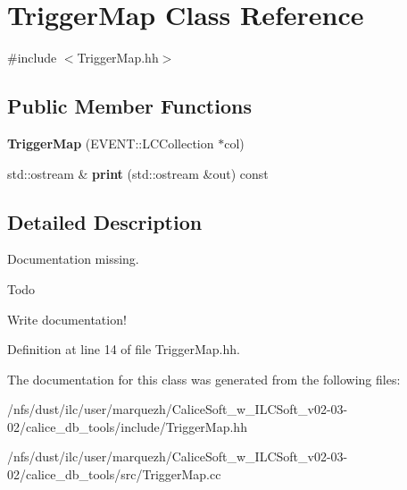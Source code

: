 \section{Trigger\-Map Class Reference}
\label{classTriggerMap}


{\ttfamily \#include $<$Trigger\-Map.\-hh$>$}

\subsection*{Public Member Functions}
\begin{DoxyCompactItemize}
\item 
{\bfseries Trigger\-Map} (E\-V\-E\-N\-T\-::\-L\-C\-Collection $\ast$col)\label{classTriggerMap_a23752fc2e02a6689cfdb5014cc5e1a5d}

\item 
std\-::ostream \& {\bfseries print} (std\-::ostream \&out) const \label{classTriggerMap_aef710938c4e2d4c367aabb57a41ca66b}

\end{DoxyCompactItemize}


\subsection{Detailed Description}
Documentation missing. \begin{DoxyRefDesc}{Todo}
\item[{\bf Todo}]Write documentation!\end{DoxyRefDesc}


Definition at line 14 of file Trigger\-Map.\-hh.



The documentation for this class was generated from the following files\-:\begin{DoxyCompactItemize}
\item 
/nfs/dust/ilc/user/marquezh/\-Calice\-Soft\-\_\-w\-\_\-\-I\-L\-C\-Soft\-\_\-v02-\/03-\/02/calice\-\_\-db\-\_\-tools/include/Trigger\-Map.\-hh\item 
/nfs/dust/ilc/user/marquezh/\-Calice\-Soft\-\_\-w\-\_\-\-I\-L\-C\-Soft\-\_\-v02-\/03-\/02/calice\-\_\-db\-\_\-tools/src/Trigger\-Map.\-cc\end{DoxyCompactItemize}
